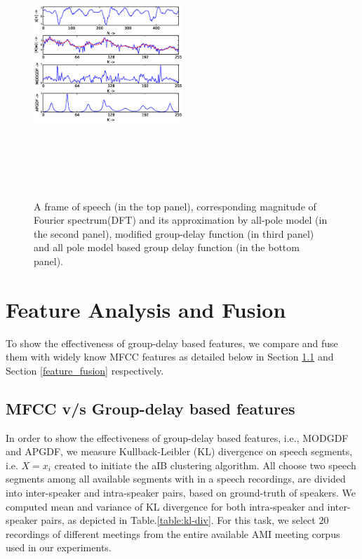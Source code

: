 \documentclass[conference]{IEEEtran}
\begin{document}
\begin{figure}[h]
\centering
\includegraphics[width=0.5\textwidth,height=10cm]{figures/apSpectrum.eps}
\caption{ A frame of speech (in the top panel), corresponding magnitude of
Fourier spectrum(DFT) and its approximation by all-pole model (in the second
panel), modified group-delay function (in third panel) and all pole model based
group delay function (in the bottom panel).}
\label{fig:all-pole}
\end{figure}



\section{Feature Analysis and Fusion}
\label{feature_analysis_and_fusion}

To show the effectiveness of group-delay based features, we compare and fuse
them with widely know MFCC features as detailed below in Section
\ref{feature_analysis} and Section \ref{feature_fusion} respectively.

\subsection{MFCC v/s Group-delay based features}
\label{feature_analysis}
In order to show the effectiveness of group-delay based features, i.e., MODGDF
and APGDF, we measure Kullback-Leibler (KL) divergence on speech segments, i.e.
$X={x_i}$ created to initiate the aIB clustering algorithm. All choose two
speech segments among all available segments with in a speech recordings, are
divided into inter-speaker and intra-speaker pairs, based on ground-truth of
speakers. We computed mean and variance of KL divergence for both intra-speaker
and inter-speaker pairs, as depicted in Table.\ref{table:kl-div}. For this task,
we select $20$ recordings of different meetings from the entire available AMI
meeting corpus used in our experiments. 
\end{document}
